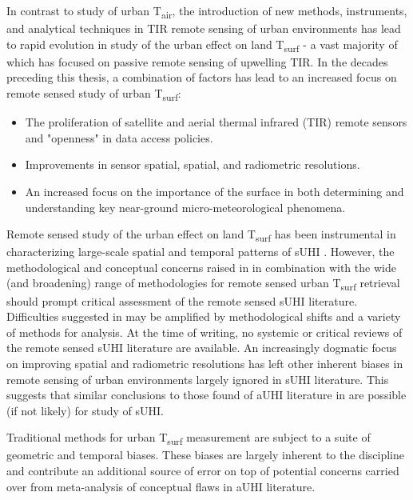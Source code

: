 \begin{bibunit}
In contrast to study of urban T\textsubscript{air}, the introduction of new methods, instruments, and analytical techniques in TIR remote sensing of urban environments has lead to rapid evolution in study of the urban effect on land T\textsubscript{surf} - a vast majority of which has focused on passive remote sensing of upwelling TIR. In the decades preceding this thesis, a combination of factors has lead to an increased focus on remote sensed study of urban T\textsubscript{surf}: 

\begin{itemize}
	\item The proliferation of satellite and aerial thermal infrared (TIR) remote sensors and "openness" in data access policies.
	\item Improvements in sensor spatial, spatial, and radiometric resolutions. 
	\item An increased focus on the importance of the surface in both determining and understanding key near-ground micro-meteorological phenomena.
\end{itemize}

Remote sensed study of the urban effect on land T\textsubscript{surf} has been instrumental in characterizing large-scale spatial and temporal patterns of sUHI \citep{Peng2012, Streutker2003, Imhoff2010}. However, the methodological and conceptual concerns raised in \citet{Stewart2011} in combination with the wide (and broadening) range of methodologies for remote sensed urban T\textsubscript{surf} retrieval should prompt critical assessment of the remote sensed sUHI literature. Difficulties suggested in \citet{Stewart2011} may be amplified by methodological shifts and a variety of methods for analysis. At the time of writing, no systemic or critical reviews of the remote sensed sUHI literature are available. An increasingly dogmatic focus on improving spatial and radiometric resolutions has left other inherent biases in remote sensing of urban environments largely ignored in sUHI literature. This suggests that similar conclusions to those found of aUHI literature in \citet{Stewart2011} are possible (if not likely) for study of sUHI. 

Traditional methods for urban T\textsubscript{surf} measurement are subject to a suite of geometric and temporal biases. These biases are largely inherent to the discipline and contribute an additional source of error on top of potential concerns carried over from meta-analysis of conceptual flaws in aUHI literature. 


\end{bibunit}
